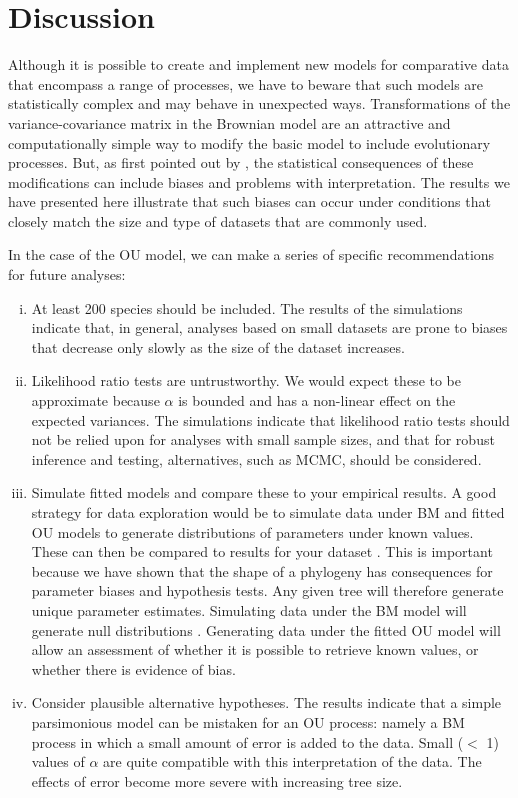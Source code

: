 \documentclass[a4paper,12pt]{article}
\begin{document}
\section{Discussion}
\label{section:discussion}
Although it is possible to create and implement new models for comparative data that encompass a range of processes, we have to beware that such models are statistically complex and may behave in unexpected ways. Transformations of the variance-covariance matrix in the Brownian model are an attractive and computationally simple way to modify the basic model to include evolutionary processes. But, as first pointed out by \citet{grafen1989phylogenetic}, the statistical consequences of these modifications can include biases and problems with interpretation. The results we have presented here illustrate that such biases can occur under conditions that closely match the size and type of datasets that are commonly used. 

In the case of the OU model, we can make a series of specific recommendations for future analyses:
\begin{enumerate}[(i)]
  \item At least 200 species should be included. The results of the simulations indicate that, in general, analyses based on small datasets are prone to biases that decrease only slowly as the size of the dataset increases.  
  \item Likelihood ratio tests are untrustworthy. We would expect these to be approximate because $\alpha$ is bounded and has a non-linear effect on the expected variances. The simulations indicate that likelihood ratio tests should not be relied upon for analyses with small sample sizes, and that for robust inference and testing, alternatives, such as MCMC, should be considered. 
  \item Simulate fitted models and compare these to your empirical results. A good strategy for data exploration would be to simulate data under BM and fitted OU models to generate distributions of parameters under known values. These can then be compared to results for your dataset \citep[see][for a related approach]{slater2013robust}. This is important because we have shown that the shape of a phylogeny has consequences for parameter biases and hypothesis tests. Any given tree will therefore generate unique parameter estimates. Simulating data under the BM model will generate null distributions \citep[e.g.,][]{boettiger2012your}. Generating data under the fitted OU model will allow an assessment of whether it is possible to retrieve known values, or whether there is evidence of bias. 
  \item Consider plausible alternative hypotheses. The results indicate that a simple parsimonious model can be mistaken for an OU process: namely a BM process in which a small amount of error is added to the data. Small ($<$ 1) values of $\alpha$ are quite compatible with this interpretation of the data. The effects of error become more severe with increasing tree size. 
\end{enumerate}
\end{document}
